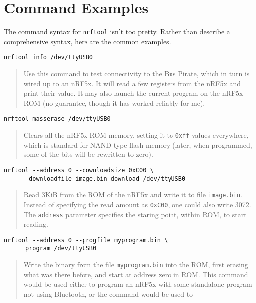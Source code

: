 \documentclass{article}
\begin{document}
\section*{Command Examples}

The command syntax for \texttt{nrftool} isn't too pretty. Rather than describe a comprehensive syntax, 
here are the common examples.
\begin{trivlist}
\item \begin{verbatim}
nrftool info /dev/ttyUSB0
\end{verbatim}
\begin{quote}
Use this command to test connectivity to the Bus Pirate, which in turn is wired up to an nRF5x. 
It will read a few registers from the nRF5x and print their value. It may also launch the current 
program on the nRF5x ROM (no guarantee, though it has worked reliably for me).
\end{quote}
\item \begin{verbatim}
nrftool masserase /dev/ttyUSB0
\end{verbatim}
\begin{quote}
Clears all the nRF5x ROM memory, setting it to \texttt{0xff} values everywhere, which is standard
for NAND-type flash memory (later, when programmed, some of the bits will be rewritten to zero).
\end{quote}
\item \begin{verbatim}
nrftool --address 0 --downloadsize 0xC00 \
     --downloadfile image.bin download /dev/ttyUSB0
\end{verbatim}
\begin{quote}
Read 3KiB from the ROM of the nRF5x and write it to file \texttt{image.bin}. Instead of 
specifying the read amount as \texttt{0xC00}, one could also write 3072. The \texttt{address}
parameter specifies the staring point, within ROM, to start reading.  
\end{quote}
\item \begin{verbatim}
nrftool --address 0 --progfile myprogram.bin \
      program /dev/ttyUSB0
\end{verbatim}
\begin{quote}
Write the binary from the file \texttt{myprogram.bin} into the ROM, first erasing what was 
there before, and start at address zero in ROM. This command would be used either to program
an nRF5x with some standalone program not using Bluetooth, or the command would be used to 

\end{quote}
\end{trivlist}
\end{document}
